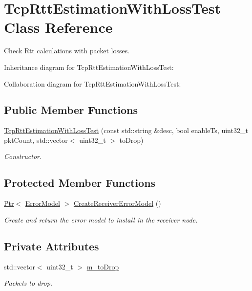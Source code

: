 \hypertarget{classTcpRttEstimationWithLossTest}{}\section{Tcp\+Rtt\+Estimation\+With\+Loss\+Test Class Reference}
\label{classTcpRttEstimationWithLossTest}


Check Rtt calculations with packet losses.  




Inheritance diagram for Tcp\+Rtt\+Estimation\+With\+Loss\+Test\+:


Collaboration diagram for Tcp\+Rtt\+Estimation\+With\+Loss\+Test\+:
\subsection*{Public Member Functions}
\begin{DoxyCompactItemize}
\item 
\hyperlink{classTcpRttEstimationWithLossTest_aa71e6a97fc4a2c909d8803519db8c9b6}{Tcp\+Rtt\+Estimation\+With\+Loss\+Test} (const std\+::string \&desc, bool enable\+Ts, uint32\+\_\+t pkt\+Count, std\+::vector$<$ uint32\+\_\+t $>$ to\+Drop)
\begin{DoxyCompactList}\small\item\em Constructor. \end{DoxyCompactList}\end{DoxyCompactItemize}
\subsection*{Protected Member Functions}
\begin{DoxyCompactItemize}
\item 
\hyperlink{classns3_1_1Ptr}{Ptr}$<$ \hyperlink{classns3_1_1ErrorModel}{Error\+Model} $>$ \hyperlink{classTcpRttEstimationWithLossTest_a72a578c553fd6835f4234af0890efd8b}{Create\+Receiver\+Error\+Model} ()
\begin{DoxyCompactList}\small\item\em Create and return the error model to install in the receiver node. \end{DoxyCompactList}\end{DoxyCompactItemize}
\subsection*{Private Attributes}
\begin{DoxyCompactItemize}
\item 
std\+::vector$<$ uint32\+\_\+t $>$ \hyperlink{classTcpRttEstimationWithLossTest_ad7a7eff0d4e1e9a2c4a6f3375a5effc4}{m\+\_\+to\+Drop}
\begin{DoxyCompactList}\small\item\em Packets to drop. \end{DoxyCompactList}\end{DoxyCompactItemize}
